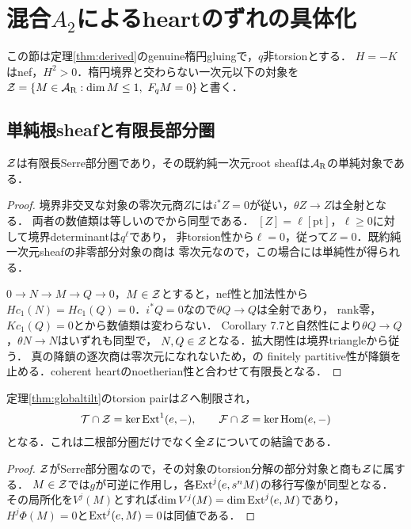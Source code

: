 \section{混合\texorpdfstring{$A_2$}{A2}によるheartのずれの具体化}\label{sec:A2}
この節は定理\ref{thm:derived}のgenuine楕円gluingで，$q$非torsionとする．
$H=-K$はnef，$H^2>0$．楕円境界と交わらない一次元以下の対象を
$\cZ=\{M\in\AR:\dim M\le1,\ F_qM=0\}$と書く．

\subsection{単純根sheafと有限長部分圏}
\begin{lemma}\label{lem:offboundary}
$\mathcal Z$は有限長Serre部分圏であり，その既約純一次元root sheafは$\mathcal A_{\mathrm R}$の単純対象である．
\end{lemma}
\begin{proof}
境界非交叉な対象の零次元商$Z$には$i^*Z=0$が従い，$\theta Z\to Z$は全射となる．
両者の数値類は等しいので\cite[Corollary 7.7]{Rains}から同型である．
$[Z]=\ell[\mathrm{pt}]$，$\ell\ge0$に対して境界determinantは$q^{\ell}$であり，
非torsion性から$\ell=0$，従って$Z=0$．既約純一次元sheafの非零部分対象の商は
零次元なので，この場合には単純性が得られる．

$0\to N\to M\to Q\to0$，$M\in\mathcal Z$とすると，nef性と加法性から
$Hc_1(N)=Hc_1(Q)=0$．$i^*Q=0$なので$\theta Q\to Q$は全射であり，
rank零，$Kc_1(Q)=0$と\cite[Corollary 7.15]{Rains}から数値類は変わらない．
Corollary 7.7と自然性により$\theta Q\to Q$，$\theta N\to N$はいずれも同型で，
$N,Q\in\mathcal Z$となる．拡大閉性は境界triangleから従う．
真の降鎖の逐次商は零次元になれないため，\cite[Proposition 7.32]{Rains}の
finitely partitive性が降鎖を止める．coherent heartのnoetherian性と合わせて有限長となる．
\end{proof}

\begin{corollary}\label{cor:Ztilt}
定理\ref{thm:globaltilt}のtorsion pairは$\mathcal Z$へ制限され，
\[
\mathcal T\cap\mathcal Z=\ker\operatorname{Ext}^1(e,-),\qquad
\mathcal F\cap\mathcal Z=\ker\operatorname{Hom}(e,-)
\]
となる．これは二根部分圏だけでなく全$\mathcal Z$についての結論である．
\end{corollary}
\begin{proof}
$\mathcal Z$がSerre部分圏なので，その対象のtorsion分解の部分対象と商も$\mathcal Z$に属する．
$M\in\mathcal Z$では$g$が可逆に作用し，各$\operatorname{Ext}^j(e,s^nM)$の移行写像が同型となる．
その局所化を$V^j(M)$とすれば$\dim V^j(M)=\dim\operatorname{Ext}^j(e,M)$であり，
$H^j\Phi(M)=0$と$\operatorname{Ext}^j(e,M)=0$は同値である．
\end{proof}


